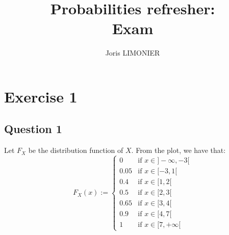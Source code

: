 \documentclass{article}
\title{Probabilities refresher:\\
Exam}
\author{Joris LIMONIER}
\begin{document}
\maketitle

\section{Exercise 1}
\subsection{Question 1}
Let \(F_X\) be the distribution function of \(X\). From the plot, we have that:
\[
    F_X(x) :=
    \begin{cases}
        0    & \text{if } x \in ]-\infty, -3[ \\
        0.05 & \text{if } x \in [-3,1[        \\
        0.4  & \text{if } x \in [1,2[         \\
        0.5  & \text{if } x \in [2,3[         \\
        0.65 & \text{if } x \in [3,4[         \\
        0.9  & \text{if } x \in [4,7[         \\
        1    & \text{if } x \in [7, +\infty[
    \end{cases}
\]
\end{document}
